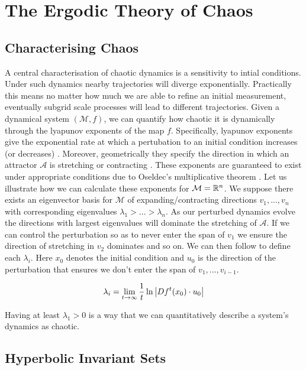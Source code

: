 \section{The Ergodic Theory of Chaos}

\subsection{Characterising Chaos}

A central characterisation of chaotic dynamics is a sensitivity to intial conditions. Under such dynamics nearby trajectories will diverge exponentially. Practically this means no matter how much we are able to refine an initial measurement, eventually subgrid scale processes will lead to different trajectories. Given a dynamical system $\left( \mathcal{M}, f \right)$, we can quantify how chaotic it is dynamically through the lyapunov exponents of the map $f$. Specifically, lyapunov exponents give the exponential rate at which a pertubation to an initial condition increases (or decreases) \cite{Eckmann1985}. Moreover, geometrically they specify the direction in which an attractor $\mathcal{A}$ is stretching or contracting \cite{Ott2002}. These exponents are guaranteed to exist under appropriate conditions due to Oseldec's multiplicative theorem \cite{Eckmann1985}. Let us illustrate how we can calculate these exponents for $\mathcal{M} = \mathbb{R}^n$. We suppose there exists an eigenvector basis for $\mathcal{M}$ of expanding/contracting directions $v_1, ... , v_n$ with corresponding eigenvalues $\lambda_1 > ...> \lambda_n$. As our perturbed dynamics evolve the directions with largest eigenvalues will dominate the stretching of $\mathcal{A}$. If we can control the perturbation so as to never enter the span of $v_1$ we ensure the direction of stretching in $v_2$ dominates and so on. We can then follow \cite{Ott2002} to define each $\lambda_i$. Here $x_0$ denotes the initial condition and $u_0$ is the direction of the perturbation that ensures we don't enter the span of $v_1, ..., v_{i-1}$.

\begin{align*}
\lambda_i = \lim_{t \to \infty} \frac{1}{t} \ln \abs{Df^t(x_0) \cdot u_0}
\end{align*}

\noindent Having at least $\lambda_1 > 0$ is a way that we can quantitatively describe a system's dynamics as chaotic.

\subsection{Hyperbolic Invariant Sets}

